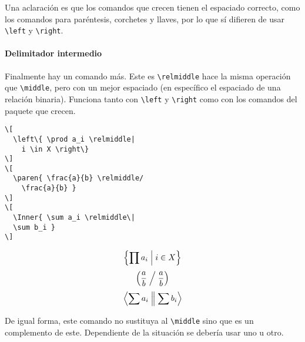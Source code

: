 \documentclass[11pt]{article}
\begin{document}
Una aclaración es que los comandos que crecen tienen el espaciado correcto, como los comandos para paréntesis, corchetes y llaves, por lo que sí difieren de usar \verb|\left| y \verb|\right|.


\paragraph{Delimitador intermedio} Finalmente hay un comando más. Este es \verb|\relmiddle| hace la misma operación que \verb|\middle|, pero con un mejor espaciado (en específico el espaciado de una relación binaria). Funciona tanto con \verb|\left| y \verb|\right| como con los comandos del paquete que crecen.
\begin{center}
  \begin{minipage}{0.45\textwidth}
  \begin{verbatim}\[
  \left\{ \prod a_i \relmiddle|
    i \in X \right\}
\]
\[
  \paren{ \frac{a}{b} \relmiddle/
    \frac{a}{b} }
\]
\[
  \Inner{ \sum a_i \relmiddle\|
  \sum b_i }
\]\end{verbatim}
  \end{minipage}
  \begin{minipage}{0.45\textwidth}
  \[
    \left\{ \prod a_i \mathrel{}\middle|\mathrel{}
      i \in X \right\}
  \]
  \[
    \paren{ \frac{a}{b} \relmiddle/
      \frac{a}{b} }
  \]
  \[
    \Inner{ \sum a_i \relmiddle\|
    \sum b_i }
  \]
  \end{minipage}
\end{center}

De igual forma, este comando no sustituya al \verb|\middle| sino que es un complemento de este. Dependiente de la situación se debería usar uno u otro.
\end{document}
